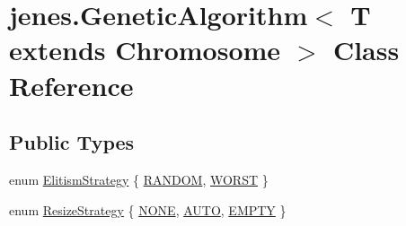 \hypertarget{classjenes_1_1_genetic_algorithm_3_01_t_01extends_01_chromosome_01_4}{
\section{jenes.GeneticAlgorithm$<$ T extends Chromosome $>$ Class Reference}
\label{classjenes_1_1_genetic_algorithm_3_01_t_01extends_01_chromosome_01_4}
}
\subsection*{Public Types}
\begin{CompactItemize}
\item 
enum \hyperlink{classjenes_1_1_genetic_algorithm_3_01_t_01extends_01_chromosome_01_4_afb755e144130d2c2c6ca86134dd871e}{ElitismStrategy} \{ \hyperlink{_genetic_algorithm_8java_afb755e144130d2c2c6ca86134dd871ea2b65445a3a16f164c5e811064d75726}{RANDOM}, 
\hyperlink{_genetic_algorithm_8java_afb755e144130d2c2c6ca86134dd871eed58eb79392224559f176f4794c570e1}{WORST}
 \}
\item 
enum \hyperlink{classjenes_1_1_genetic_algorithm_3_01_t_01extends_01_chromosome_01_4_49749d00b9417b958d1b30e08fc21d53}{ResizeStrategy} \{ \hyperlink{_genetic_algorithm_8java_49749d00b9417b958d1b30e08fc21d53c157bdf0b85a40d2619cbc8bc1ae5fe2}{NONE}, 
\hyperlink{_genetic_algorithm_8java_49749d00b9417b958d1b30e08fc21d53eef9468d1b98bca652a04bf5063fd9d6}{AUTO}, 
\hyperlink{_genetic_algorithm_8java_49749d00b9417b958d1b30e08fc21d532f0d18fc0d0fa4a6cd92dc328501874d}{EMPTY}
 \}
\end{CompactItemize}
